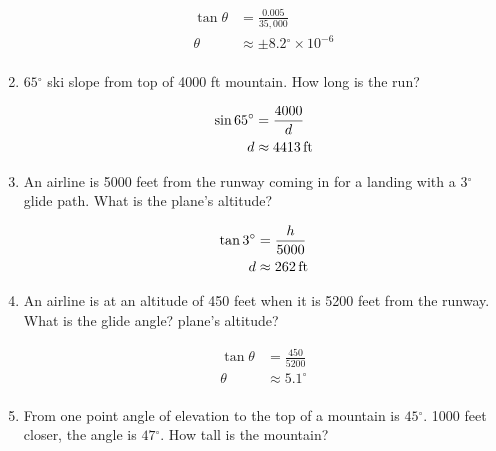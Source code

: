 \documentclass{exam}
\newcommand{\dg}{\ensuremath{^\circ}}
\begin{document}
\begin{enumerate}
\begin{parts}
\begin{solution}
            \begin{align*}
              \tan \theta & = \frac{0.005}{35,000} \\
              \theta      & \approx \pm 8.2 \dg \times 10^{-6} \\
            \end{align*}

          \end{solution}

      \end{parts}

    \item $65 \dg$ ski slope from top of 4000 ft mountain.  How long is the run?
      \begin{solution}
        \begin{align*}
          \sin 65 \dg & = \frac{4000}{d} \\
          d           & \approx \unit[4413]{ft}
        \end{align*}
      \end{solution}

    \item An airline is 5000 feet from the runway coming in for a landing with a $3 \dg$ glide path.  What is the
      plane's altitude?

      \begin{solution}
        \begin{align*}
          \tan 3 \dg & = \frac{h}{5000} \\
          d           & \approx \unit[262]{ft}
        \end{align*}
      \end{solution}

    \item An airline is at an altitude of 450 feet when it is 5200 feet from the runway.  What is the glide angle? 
      plane's altitude?

      \begin{solution}
        \begin{align*}
          \tan \theta & = \frac{450}{5200} \\
          \theta      & \approx 5.1 \dg \\
        \end{align*}
      \end{solution}

    \item From one point angle of elevation to the top of a mountain is $45 \dg$.  1000 feet closer, the angle is $47 \dg$.  How
      tall is the mountain?


\end{enumerate}
\end{document}
